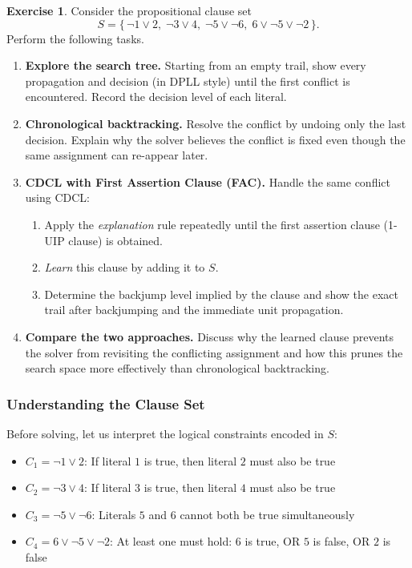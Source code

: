 \documentclass[11pt,a4paper]{article}
\theoremstyle{definition}
\newtheorem{exercise}{Exercise}[section]
\theoremstyle{plain}
\theoremstyle{remark}
\begin{document}
\begin{exercise}
Consider the propositional clause set
\[
S = \{\, \neg 1 \lor 2,\; \neg 3 \lor 4,\; \neg 5 \lor \neg 6,\; 6 \lor \neg 5 \lor \neg 2 \,\}.
\]
Perform the following tasks.
\begin{enumerate}
    \item \textbf{Explore the search tree.} Starting from an empty trail, show every propagation and decision (in DPLL style) until the first conflict is encountered. Record the decision level of each literal.
    \item \textbf{Chronological backtracking.} Resolve the conflict by undoing only the last decision. Explain why the solver believes the conflict is fixed even though the same assignment can re-appear later.
    \item \textbf{CDCL with First Assertion Clause (FAC).} Handle the same conflict using CDCL:
    \begin{enumerate}
        \item Apply the \emph{explanation} rule repeatedly until the first assertion clause (1-UIP clause) is obtained.
        \item \emph{Learn} this clause by adding it to $S$.
        \item Determine the backjump level implied by the clause and show the exact trail after backjumping and the immediate unit propagation.
    \end{enumerate}
    \item \textbf{Compare the two approaches.} Discuss why the learned clause prevents the solver from revisiting the conflicting assignment and how this prunes the search space more effectively than chronological backtracking.
\end{enumerate}
\end{exercise}

\subsubsection{Understanding the Clause Set}

Before solving, let us interpret the logical constraints encoded in $S$:
\begin{itemize}
    \item $C_1 = \neg 1 \lor 2$: If literal $1$ is true, then literal $2$ must also be true
    \item $C_2 = \neg 3 \lor 4$: If literal $3$ is true, then literal $4$ must also be true
    \item $C_3 = \neg 5 \lor \neg 6$: Literals $5$ and $6$ cannot both be true simultaneously
    \item $C_4 = 6 \lor \neg 5 \lor \neg 2$: At least one must hold: $6$ is true, OR $5$ is false, OR $2$ is false
\end{itemize}
\end{document}
